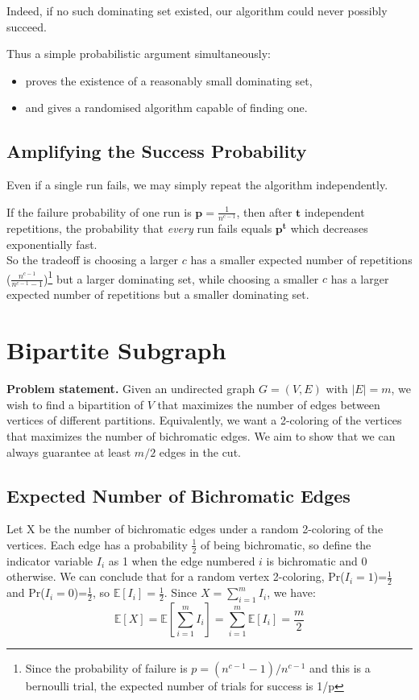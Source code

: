 \documentclass[11pt,openany]{book}
\begin{document}
Indeed, if no such dominating set existed, our algorithm could never possibly succeed.

Thus a simple probabilistic argument simultaneously:
\begin{itemize}
    \item proves the existence of a reasonably small dominating set,
    \item and gives a randomised algorithm capable of finding one.
\end{itemize}

\subsection*{Amplifying the Success Probability}

Even if a single run fails, we may simply repeat the algorithm independently.

If the failure probability of one run is $\bm{p}=\frac{1}{n^{c-1}}$, 
then after $\bm{t}$ independent repetitions, the probability that \emph{every} run fails equals $\bm{p^t}$
which decreases exponentially fast. \\

So the tradeoff is choosing a larger $c$ has a smaller expected number of repetitions ($\frac{n^{c-1}}{n^{c-1}-1}$)\footnote{Since the probability of failure is $p=(n^{c-1}-1)/n^{c-1}$ and this is a bernoulli trial, the expected number of trials for success is 1/p } but a larger dominating set,
while choosing a smaller $c$ has a larger expected number of repetitions but a smaller dominating set.

\section{Bipartite Subgraph}

\textbf{Problem statement.}
Given an undirected graph $G=(V,E)$ with $|E|=m$, we wish to find a bipartition of $V$ that maximizes the number of edges between vertices of different partitions.
Equivalently, we want a 2-coloring of the vertices that maximizes the number of bichromatic edges. We aim to show that we can always guarantee at least $m/2$ edges in the cut.

\subsection{Expected Number of Bichromatic Edges}
Let X be the number of bichromatic edges under a random 2-coloring of the vertices. 
Each edge has a probability $\frac{1}{2}$ of being bichromatic, so define the indicator variable $I_{i}$ as 1
 when the edge numbered $i$ is bichromatic and 0 otherwise. We can conclude that for a random vertex 2-coloring, 
 Pr($I_{i}=1$)=$\frac{1}{2}$ and Pr($I_{i}=0$)=$\frac{1}{2}$, so $\mathbb{E}[I_{i}]=\frac{1}{2}$.
Since $X=\sum_{i=1}^{m}I_{i}$, we have:
\[
\mathbb{E}[X]=\mathbb{E}[\sum_{i=1}^{m}I_{i}]=\sum_{i=1}^{m}\mathbb{E}[I_{i}]=\frac{m}{2}
\]
\end{document}
